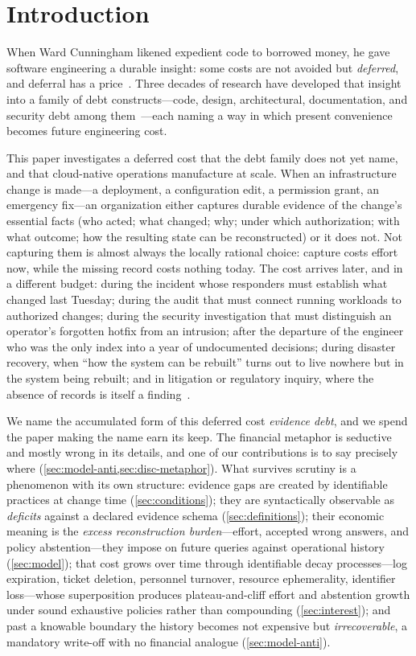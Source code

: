 \section{Introduction}
\label{sec:intro}

When Ward Cunningham likened expedient code to borrowed money, he gave software
engineering a durable insight: some costs are not avoided but \emph{deferred}, and
deferral has a price~\cite{cunningham1992}. Three decades of research have developed
that insight into a family of debt constructs---code, design, architectural,
documentation, and security debt among them~\cite{kruchten2012,li2015,tom2013,
alves2016,rindell2019}---each naming a way in which present convenience becomes
future engineering cost.

This paper investigates a deferred cost that the debt family does not yet name, and
that cloud-native operations manufacture at scale. When an infrastructure change is
made---a deployment, a configuration edit, a permission grant, an emergency fix---an
organization either captures durable evidence of the change's essential facts (who
acted; what changed; why; under which authorization; with what outcome; how the
resulting state can be reconstructed) or it does not. Not capturing them is almost
always the locally rational choice: capture costs effort now, while the missing
record costs nothing today. The cost arrives later, and in a different budget: during
the incident whose responders must establish what changed last Tuesday; during the
audit that must connect running workloads to authorized changes; during the security
investigation that must distinguish an operator's forgotten hotfix from an intrusion;
after the departure of the engineer who was the only index into a year of undocumented
decisions; during disaster recovery, when ``how the system can be rebuilt'' turns out
to live nowhere but in the system being rebuilt; and in litigation or regulatory
inquiry, where the absence of records is itself a finding~\cite{sedona2018,sox2002}.

We name the accumulated form of this deferred cost \emph{evidence debt}, and we spend
the paper making the name earn its keep. The financial metaphor is seductive and
mostly wrong in its details, and one of our contributions is to say precisely where
(\cref{sec:model-anti,sec:disc-metaphor}). What survives scrutiny is a phenomenon
with its own structure: evidence gaps are created by identifiable practices at change
time (\cref{sec:conditions}); they are syntactically observable as \emph{deficits}
against a declared evidence schema (\cref{sec:definitions}); their economic meaning
is the \emph{excess reconstruction burden}---effort, accepted wrong answers, and
policy abstention---they impose on future queries against
operational history (\cref{sec:model}); that cost grows over time through
identifiable decay processes---log expiration, ticket deletion, personnel turnover,
resource ephemerality, identifier loss---whose superposition produces plateau-and-cliff
effort and abstention growth under sound exhaustive policies rather than compounding
(\cref{sec:interest}); and past a knowable boundary the history
becomes not expensive but \emph{irrecoverable}, a mandatory write-off with no
financial analogue (\cref{sec:model-anti}).

